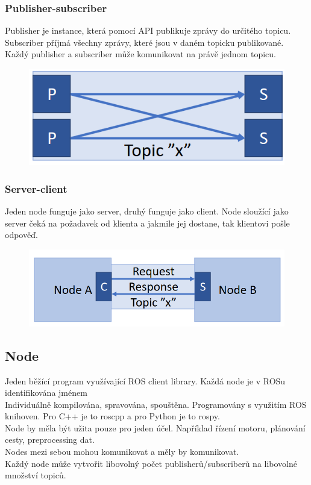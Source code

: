 \subsubsection{Publisher-subscriber}
Publisher je instance, která pomocí API publikuje zprávy do určitého topicu. \\
Subscriber příjmá všechny zprávy, které jsou v daném topicku publikované.\\
Každý publisher a subscriber může komunikovat na právě jednom topicu.\\
\begin{figure}[h!]
    \centering
    \includegraphics[scale = 0.3]{img/PubSub.png}
\end{figure}
\subsubsection{Server-client}
Jeden node funguje jako server, druhý funguje jako client. Node sloužící jako server čeká na požadavek od klienta a jakmile jej dostane, tak klientovi pošle odpověď.\\
\begin{figure}[h!]
    \centering
    \includegraphics[scale = 0.3]{img/ServClient.png}
\end{figure}
\subsection{Node}
Jeden běžící program využívající ROS client library. Každá node je v ROSu identifikována jménem\\
Individuálně kompilována, spravována, spouštěna. Programovány s využitím ROS knihoven. Pro C++ je to roscpp a pro Python je to rospy.\\
Node by měla být užita pouze pro jeden účel. Například řízení motoru, plánování cesty, preprocessing dat.\\
Nodes mezi sebou mohou komunikovat a měly by komunikovat.\\
Každý node může vytvořit libovolný počet publisherů/subscriberů na libovolné množství topiců.\\
